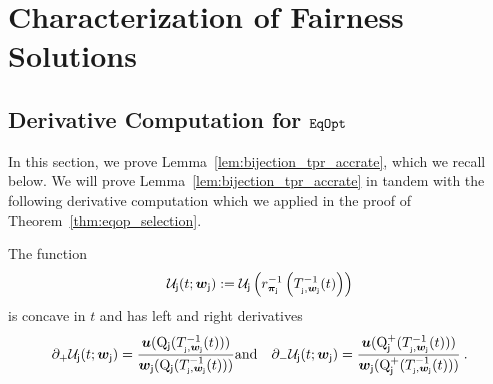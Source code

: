 
	\section{Characterization of Fairness Solutions\label{sec:char_fairness_solns}}
	


\subsection{Derivative Computation for $\mathtt{EqOpt}$\label{sec:char_fairness_solns_eqopp}}
In this section, we prove Lemma~\ref{lem:bijection_tpr_accrate}, which we recall below.
\bijectiontpr*
We will prove Lemma~\ref{lem:bijection_tpr_accrate} in tandem with the following derivative computation which we applied in the proof of Theorem~\ref{thm:eqop_selection}.

\begin{lem}\label{lem:const_to_util_derv}
	The function
	\begin{eqnarray*}
	\mathcal{U}_{\mathsf{j}}(t;\boldsymbol{w}_{\mathsf{j}}) := \mathcal{U}_{\mathsf{j}}\left(r_{\boldsymbol{\pi}_{\mathsf{j}}}^{-1}\left(T_{_{\mathsf{j}},\boldsymbol{w}_{\mathsf{j}}}^{-1}(t )\right)\right)
	\end{eqnarray*}
	is concave in $t$ and has left and right derivatives
	\begin{eqnarray*}
	\partial_+ \mathcal{U}_{\mathsf{j}}(t;\boldsymbol{w}_{\mathsf{j}}) =  \frac{\boldsymbol{u}(\mathrm{Q}_{\mathsf{j}}(T_{_{\mathsf{j}},\boldsymbol{w}_{\mathsf{j}}}^{-1}(t)))}{\boldsymbol{w}_{\mathsf{j}}(\mathrm{Q}_{\mathsf{j}}(T_{_{\mathsf{j}},\boldsymbol{w}_{\mathsf{j}}}^{-1}(t)))} 
	&\text{and}& \partial_- \mathcal{U}_{\mathsf{j}}(t;\boldsymbol{w}_{\mathsf{j}}) = \frac{\boldsymbol{u}(\mathrm{Q}^+_{\mathsf{j}}(T_{_{\mathsf{j}},\boldsymbol{w}_{\mathsf{j}}}^{-1}(t)))}{\boldsymbol{w}_{\mathsf{j}}(\mathrm{Q}^+_{\mathsf{j}}(T_{_{\mathsf{j}},\boldsymbol{w}_{\mathsf{j}}}^{-1}(t)))}\:.
	\end{eqnarray*}
	\end{lem}

